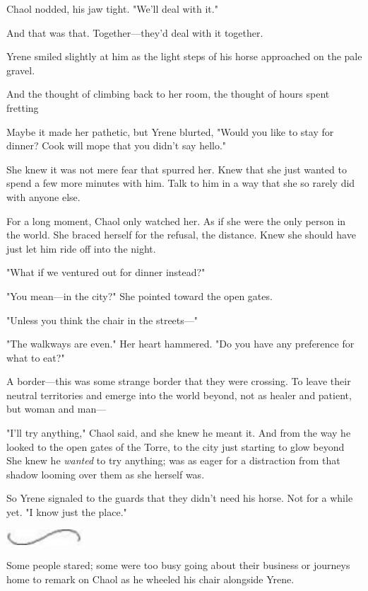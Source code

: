 Chaol nodded, his jaw tight. "We'll deal with it."

And that was that. Together---they'd deal with it together.

Yrene smiled slightly at him as the light steps of his horse approached on the pale gravel.

And the thought of climbing back to her room, the thought of hours spent fretting 

Maybe it made her pathetic, but Yrene blurted, "Would you like to stay for dinner? Cook will mope that you didn't say hello."

She knew it was not mere fear that spurred her. Knew that she just wanted to spend a few more minutes with him. Talk to him in a way that she so rarely did with anyone else.

For a long moment, Chaol only watched her. As if she were the only person in the world. She braced herself for the refusal, the distance. Knew she should have just let him ride off into the night.

"What if we ventured out for dinner instead?"

"You mean---in the city?" She pointed toward the open gates.

"Unless you think the chair in the streets---"

"The walkways are even." Her heart hammered. "Do you have any preference for what to eat?"

A border---this was some strange border that they were crossing. To leave their neutral territories and emerge into the world beyond, not as healer and patient, but woman and man---

"I'll try anything," Chaol said, and she knew he meant it. And from the way he looked to the open gates of the Torre, to the city just starting to glow beyond  She knew he \emph{wanted} to try anything; was as eager for a distraction from that shadow looming over them as she herself was.

So Yrene signaled to the guards that they didn't need his horse. Not for a while yet. "I know just the place."

\includegraphics[width=1.12in,height=0.24in]{images/seperator}

Some people stared; some were too busy going about their business or journeys home to remark on Chaol as he wheeled his chair alongside Yrene.

